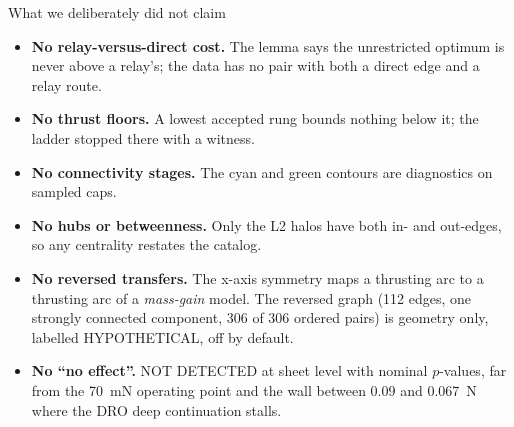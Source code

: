 \documentclass[aspectratio=169,10pt]{beamer}
\begin{document}
\begin{frame}{What we deliberately did not claim}
  \begin{itemize}
    \setlength\itemsep{7pt}
    \item \textbf{No relay-versus-direct cost.} The lemma says the unrestricted optimum is never above a relay's; the data has no pair with both a direct edge and a relay route.
    \item \textbf{No thrust floors.} A lowest accepted rung bounds nothing below it; the ladder stopped there with a witness.
    \item \textbf{No connectivity stages.} The cyan and green contours are diagnostics on sampled caps.
    \item \textbf{No hubs or betweenness.} Only the L2 halos have both in- and out-edges, so any centrality restates the catalog.
    \item \textbf{No reversed transfers.} The x-axis symmetry maps a thrusting arc to a thrusting arc of a \emph{mass-gain} model. The reversed graph (112 edges, one strongly connected component, 306 of 306 ordered pairs) is geometry only, labelled HYPOTHETICAL, off by default.
    \item \textbf{No ``no effect''.} NOT DETECTED at sheet level with nominal $p$-values, far from the 70~mN operating point and the wall between 0.09 and 0.067~N where the DRO deep continuation stalls.
  \end{itemize}
\end{frame}
\end{document}
